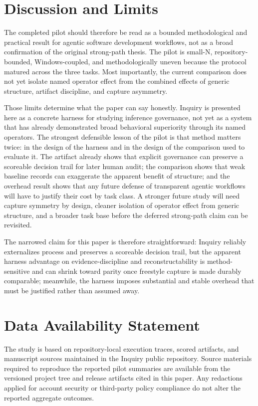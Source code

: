 \documentclass[conference]{IEEEtran}
\begin{document}
\section{Discussion and Limits}

The completed pilot should therefore be read as a bounded methodological and practical
result for agentic software development workflows, not as a broad confirmation of the
original strong-path thesis. The pilot is small-N, repository-bounded, Windows-coupled,
and methodologically uneven because the protocol matured across the three tasks. Most
importantly, the current comparison does not yet isolate named operator effect from the
combined effects of generic structure, artifact discipline, and capture asymmetry.

Those limits determine what the paper can say honestly. Inquiry is presented here as a
concrete harness for studying inference governance, not yet as a system that has already
demonstrated broad behavioral superiority through its named operators. The strongest
defensible lesson of the pilot is that method matters twice: in the design of the
harness and in the design of the comparison used to evaluate it. The artifact already
shows that explicit governance can preserve a scoreable decision trail for later human
audit; the comparison shows that weak baseline records can exaggerate the apparent
benefit of structure; and the overhead result shows that any future defense of
transparent agentic workflows will have to justify their cost by task class. A stronger
future study will need capture symmetry by design, cleaner isolation of operator effect
from generic structure, and a broader task base before the deferred strong-path claim
can be revisited.

The narrowed claim for this paper is therefore straightforward: Inquiry reliably
externalizes process and preserves a scoreable decision trail, but the apparent harness
advantage on evidence-discipline and reconstructability is method-sensitive and can
shrink toward parity once freestyle capture is made durably comparable; meanwhile, the
harness imposes substantial and stable overhead that must be justified rather than
assumed away.

\section*{Data Availability Statement}

The study is based on repository-local execution traces, scored artifacts, and
manuscript sources maintained in the Inquiry public repository. Source materials
required to reproduce the reported pilot summaries are available from the
versioned project tree and release artifacts cited in this paper. Any redactions
applied for account security or third-party policy compliance do not alter the
reported aggregate outcomes.



\end{document}
